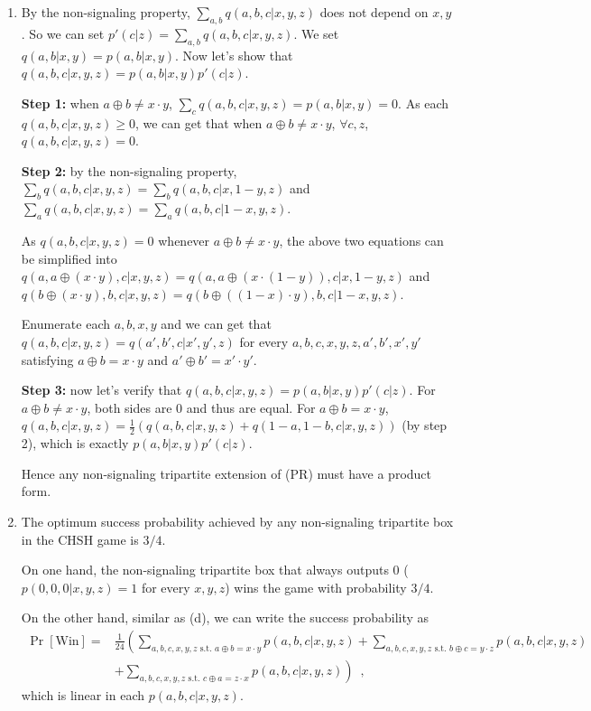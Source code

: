\documentclass[12pt]{article}
\begin{document}
\begin{enumerate}
\begin{enumerate}
(SIG) is signaling, but by part (a), any quantum non-local box is non-signaling. So (SIG) cannot be implemented using quantum mechanics.

\item By the non-signaling property, $\sum_{a, b} q(a, b, c | x, y, z)$ does not depend on $x, y$. So we can set $p'(c|z) = \sum_{a, b} q(a, b, c | x, y, z)$. We set $q(a, b | x, y) = p(a, b | x, y)$. Now let's show that $q(a, b, c|x, y, z) = p(a, b| x, y) p'(c|z)$.

\textbf{Step 1:} when $a \oplus b \ne x \cdot y$, $\sum_c q(a, b, c|x, y, z) = p(a, b | x, y) = 0$. As each $q(a, b, c|x, y, z) \ge 0$, we can get that when $a \oplus b \ne x \cdot y$, $\forall c, z$, $q(a, b, c|x, y, z) = 0$.

\textbf{Step 2:} by the non-signaling property, $\sum_{b} q(a, b, c | x, y, z) = \sum_{b} q(a, b, c | x, 1 - y, z)$ and $\sum_{a} q(a, b, c | x, y, z) = \sum_{a} q(a, b, c | 1- x, y, z)$. 

As $q(a, b, c|x, y, z) = 0$ whenever $a \oplus b \ne x \cdot y$, the above two equations can be simplified into $q(a, a \oplus (x \cdot y), c | x, y, z) = q(a, a \oplus (x \cdot (1 - y)), c | x, 1 - y, z)$ and $q(b \oplus (x \cdot y), b, c | x, y, z) = q(b \oplus ((1 - x) \cdot y), b, c | 1- x, y, z)$.

Enumerate each $a, b, x, y$ and we can get that $q(a, b, c | x, y, z) = q(a', b', c | x', y', z)$ for every $a, b, c, x, y, z, a', b', x', y'$ satisfying $a \oplus b = x \cdot y$ and $a' \oplus b' = x' \cdot y'$.

\textbf{Step 3:} now let's verify that $q(a, b, c|x, y, z) = p(a, b| x, y) p'(c|z)$. For $a \oplus b \ne x \cdot y$, both sides are 0 and thus are equal. For $a \oplus b = x \cdot y$, $q(a, b, c|x, y, z) = \frac{1}{2}(q(a, b, c|x, y, z) + q(1 - a, 1 - b, c|x, y, z))$ (by step 2), which is exactly $p(a, b| x, y) p'(c|z)$.

Hence any non-signaling tripartite extension of (PR) must have a product form.

\item The optimum success probability achieved by any non-signaling tripartite box in the CHSH game is $3/4$. 

On one hand, the non-signaling tripartite box that always outputs 0 ($p(0, 0, 0 | x, y, z) = 1$ for every $x, y, z$) wins the game with probability $3/4$. 

On the other hand, similar as (d), we can write the success probability as
\begin{align*}
	\Pr\left[\text{Win}\right] =& \frac{1}{24}\left(\sum_{a, b, c, x, y, z \text{ s.t. }a \oplus b = x \cdot y}p(a, b, c| x, y, z) + \sum_{a, b, c, x, y, z \text{ s.t. }b \oplus c = y \cdot z}p(a, b, c| x, y, z)\right.\\
	 &\left.+ \sum_{a, b, c, x, y, z \text{ s.t. }c \oplus a = z \cdot x}p(a, b, c| x, y, z)\right)\enspace,
\end{align*}
which is linear in each $p(a, b, c| x, y, z)$.


\end{enumerate}
\end{enumerate}
\end{document}

